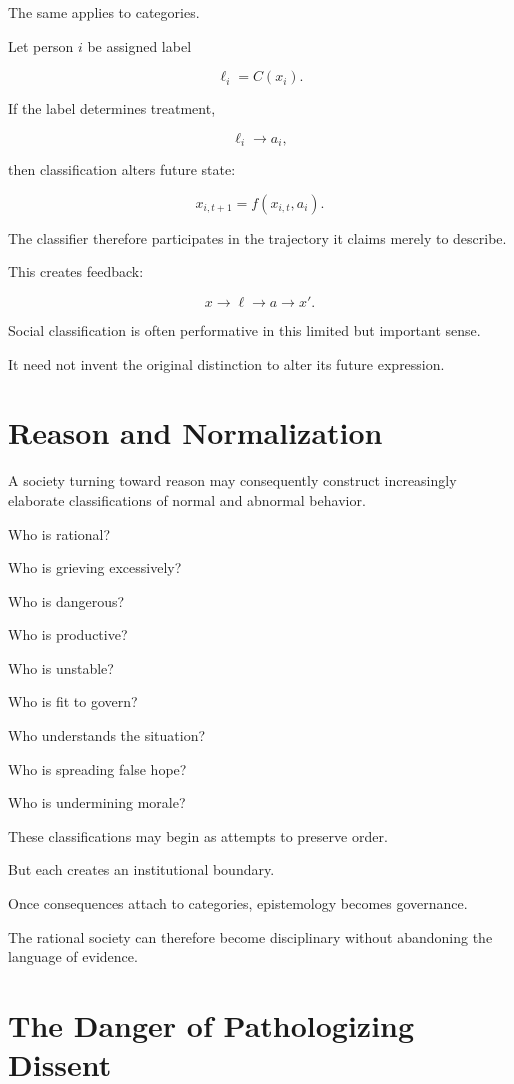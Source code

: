 \documentclass[11pt,oneside]{book}
\theoremstyle{definition}
\theoremstyle{remark}
\begin{document}
The same applies to categories.

Let person \(i\) be assigned label

\[
\ell_i=C(x_i).
\]

If the label determines treatment,

\[
\ell_i\rightarrow a_i,
\]

then classification alters future state:

\[
x_{i,t+1}
=
f(x_{i,t},a_i).
\]

The classifier therefore participates in the trajectory it claims merely to describe.

This creates feedback:

\[
x
\rightarrow
\ell
\rightarrow
a
\rightarrow
x'.
\]

Social classification is often performative in this limited but important sense.

It need not invent the original distinction to alter its future expression.

\section{Reason and Normalization}

A society turning toward reason may consequently construct increasingly elaborate classifications of normal and abnormal behavior.

Who is rational?

Who is grieving excessively?

Who is dangerous?

Who is productive?

Who is unstable?

Who is fit to govern?

Who understands the situation?

Who is spreading false hope?

Who is undermining morale?

These classifications may begin as attempts to preserve order.

But each creates an institutional boundary.

Once consequences attach to categories, epistemology becomes governance.

The rational society can therefore become disciplinary without abandoning the language of evidence.

\section{The Danger of Pathologizing Dissent}
\end{document}
